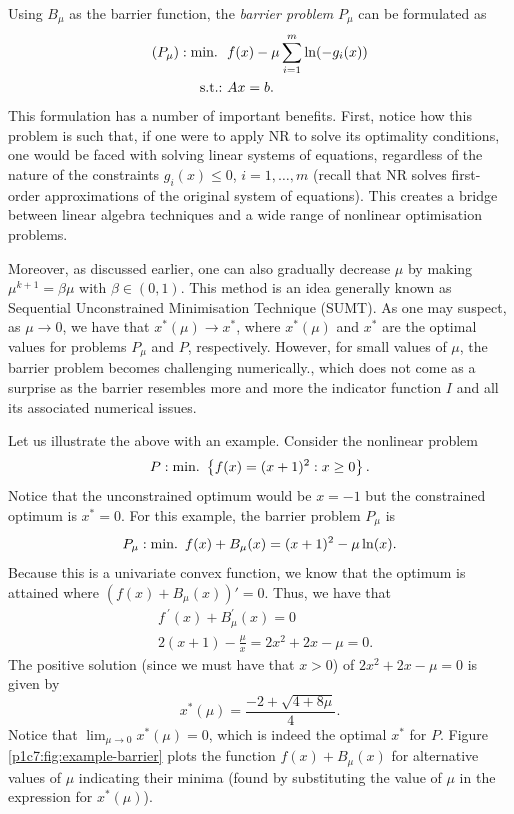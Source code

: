 Using $B_\mu$ as the barrier function, the \emph{barrier problem} $P_\mu$ can be formulated as
	\begin{align*}
		(P_\mu) : \mathop{\text{min.~}} \ &f(x) - \mu \sum_{i=1}^m\ln(-g_i(x)) \\
		\mathop{\text{s.t.:~}} & Ax = b.
	\end{align*}
	This formulation has a number of important benefits. First, notice how this problem is such that, if one were to apply NR to solve its optimality conditions, one would be faced with solving linear systems of equations, regardless of the nature of the constraints $g_i(x) \le 0$, $i = 1,\dots, m$ (recall that NR solves first-order approximations of the original system of equations). This creates a bridge between linear algebra techniques and a wide range of nonlinear optimisation problems. 
	
Moreover, as discussed earlier, one can also gradually decrease $\mu$ by making $\mu^{k+1} = \beta\mu$ with $\beta \in (0,1)$. This method is an idea generally known as Sequential Unconstrained Minimisation Technique (SUMT). As one may suspect, as $\mu \rightarrow 0$, we have that $x^*(\mu) \rightarrow x^*$, where $x^*(\mu)$ and $x^*$ are the optimal values for problems $P_\mu$ and $P$, respectively. However, for small values of $\mu$, the barrier problem becomes challenging numerically., which does not come as a surprise as the barrier resembles more and more the indicator function $I$ and all its associated numerical issues. 

Let us illustrate the above with an example. Consider the nonlinear problem 
	$$
	P : \mathop{\text{min.~}} \left\{ f(x) = (x + 1)^2 : x \geq 0 \right \}.
	$$ 
	Notice that the unconstrained optimum would be $x =-1$ but the constrained optimum is $x^* = 0$. For this example, the barrier problem $P_\mu$ is
	$$P_\mu : \mathop{\text{min.~}} f(x) + B_\mu(x) = (x + 1)^2 - \mu \ln(x).$$
	Because this is a univariate convex function, we know that the optimum is attained where $(f(x) + B_\mu(x))' =0$. Thus, we have that
	\begin{align*}
		& f^{~\prime}(x) + B_\mu^\prime(x) = 0 \\
		& 2(x+1) - \frac{\mu}{x} = 2x^2 + 2x -\mu = 0.
	\end{align*}
	The positive solution (since we must have that $x > 0$) of $2x^2 + 2x -\mu = 0$ is given by
	$$ x^*(\mu) = \frac{-2 + \sqrt{4 + 8\mu}}{4}.  
	$$ 
	Notice that $\lim_{\mu \rightarrow 0}x^*(\mu) = 0$, which is indeed the optimal $x^*$ for $P$. Figure \ref{p1c7:fig:example-barrier} plots the function $f(x) + B_\mu(x)$ for alternative values of $\mu$ indicating their minima (found by substituting the value of $\mu$ in the expression for $x^*(\mu)$). 

